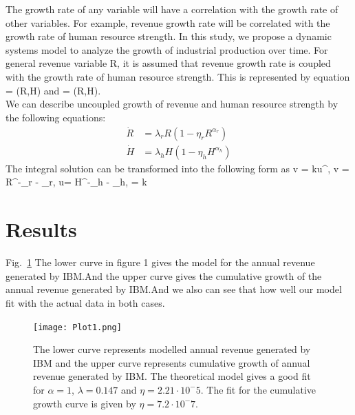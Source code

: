 \documentclass[aps,twocolumn,10pt,reprint]{revtex4}
\newcommand{\be}{\begin{equation}}
\newcommand{\ee}{\end{equation}}
\begin{document}
The growth rate of any variable will have a correlation with the growth rate of other variables. For example, revenue growth rate will be correlated with the growth rate of human resource strength. In this study, we propose a dynamic systems model to analyze the growth of industrial production over time.
For general revenue variable R, it is assumed that revenue growth rate is coupled with the growth rate of human resource strength. This is represented by equation  = \rho(R,H) and  = \sigma(R,H).
\\

We can describe uncoupled growth of revenue and human resource strength by the following equations: 
\be\label{Eq:Uncoupled}
\begin{split}
\dot{R} &= \lambda_r R (1-\eta_r R^{\alpha_r}) \\
\dot{H} &= \lambda_h H (1-\eta_h H^{\alpha_h})
\end{split}
\ee
The integral solution can be transformed into the following form as v = ku^{\beta}, \quad {} \quad v = R^{-\alpha_r} - \eta_r, \quad u= H^{-\alpha_h} - \eta_h, \quad \beta =   \quad {} \quad k 


\pagebreak

\section{Results}



Fig.~\ref{Fig:image1f} The lower curve in figure 1 gives the model for the annual revenue generated by IBM.And the upper curve gives the cumulative growth of the annual revenue generated by IBM.And we also can see that how well our model fit with the actual data in both cases.
\begin{figure}[!h]
\centering
\texttt{[image: Plot1.png]}~
\caption{The lower curve represents modelled annual revenue generated by IBM and the upper curve represents cumulative growth of annual revenue generated by IBM. The theoretical model gives a good fit for $\alpha=1$, $\lambda=0.147$ and $\eta=2.21\cdot10^-5$. The fit for the cumulative growth curve is given by $\eta=7.2 \cdot10^-7$.}\label{Fig:image1f} 
\end{figure}
\end{document}
